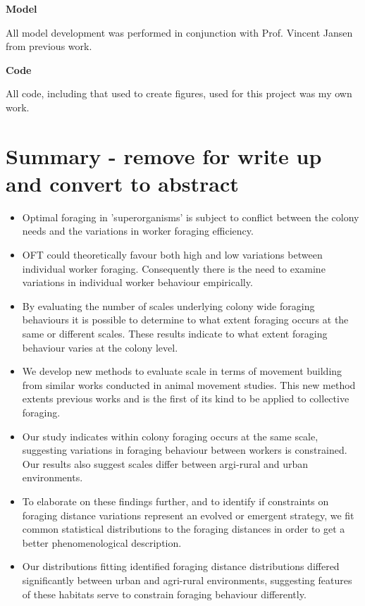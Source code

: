 \documentclass[11pt,usenames,dvipsnames]{article}
\begin{document}
\noindent
\Large{\textbf{Model}}

\noindent
All model development was performed in conjunction with Prof. Vincent Jansen from previous work.

\noindent
\Large{\textbf{Code}}

\noindent
All code, including that used to create figures, used for this project was my own work.

\newpage
\tableofcontents
\newpage

\section{Summary - remove for write up and convert to abstract}

\begin{itemize}
	\item Optimal foraging in 'superorganisms' is subject to conflict between the colony needs and the variations in worker foraging efficiency.
	\item OFT could theoretically favour both high and low variations between individual worker foraging. Consequently there is the need to examine variations in individual worker behaviour empirically.
	\item By evaluating the number of scales underlying colony wide foraging behaviours it is possible to determine to what extent foraging occurs at the same or different scales. These results indicate to what extent foraging behaviour varies at the colony level.
	\item We develop new methods to evaluate scale in terms of movement building from similar works conducted in animal movement studies. This new method extents previous works and is the first of its kind to be applied to collective foraging.
	\item Our study indicates within colony foraging occurs at the same scale, suggesting variations in foraging behaviour between workers is constrained. Our results also suggest scales differ between argi-rural and urban environments.
	\item To elaborate on these findings further, and to identify if constraints on foraging distance variations represent an evolved or emergent strategy, we fit common statistical distributions to the foraging distances in order to get a better phenomenological description.
	\item Our distributions fitting identified foraging distance distributions differed significantly between urban and agri-rural environments, suggesting features of these habitats serve to constrain foraging behaviour differently.

\end{itemize}
\end{document}
